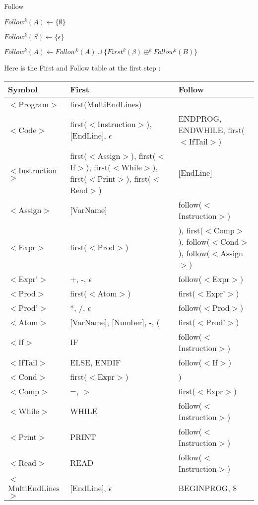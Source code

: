 \documentclass{article}
\begin{document}
\begin{algorithm}[H]
\caption{Follow}
\begin{algorithmic}
    \STATE $Follow^k (A) \gets \{\emptyset\}$
\ENDFOR

\STATE $Follow^k(S) \gets \{\epsilon\}$

\REPEAT
        \STATE $Follow^k(A) \gets Follow^k(A) \cup \{First^k(\beta) \oplus^k Follow^k(B)\}$
    \ENDIF
{}
\end{algorithmic}
\end{algorithm}

\noindent Here is the First and Follow table at the first step :

\begin{center}
\begin{tabular}{|m{3cm}|m{8cm}|m{6cm}|}
\hline
Symbol & First & Follow \\
\hline\hline
$<$Program$>$ & first(MultiEndLines) &\\
\hline
$<$Code$>$ & first($<$Instruction$>$), [EndLine], $\epsilon$ & ENDPROG, ENDWHILE, first($<$IfTail$>$) \\
\hline
$<$Instruction$>$ & first($<$Assign$>$), first($<$If$>$), first($<$While$>$), first($<$Print$>$), first($<$Read$>$) & [EndLine] \\
\hline
$<$Assign$>$ & [VarName] & follow($<$Instruction$>$) \\
\hline
$<$Expr$>$ & first($<$Prod$>$) & ), first($<$Comp$>$), follow($<$Cond$>$), follow($<$Assign$>$) \\
\hline
$<$Expr'$>$ & +, -, $\epsilon$ & follow($<$Expr$>$) \\
\hline
$<$Prod$>$ & first($<$Atom$>$) & first($<$Expr'$>$) \\
\hline
$<$Prod'$>$ & *, /, $\epsilon$ & follow($<$Prod$>$) \\
\hline
$<$Atom$>$ & [VarName], [Number], -, ( & first($<$Prod'$>$) \\
\hline
$<$If$>$ & IF & follow($<$Instruction$>$) \\
\hline
$<$IfTail$>$ & ELSE, ENDIF & follow($<$If$>$) \\
\hline
$<$Cond$>$ & first($<$Expr$>$) & ) \\
\hline
$<$Comp$>$ & =, $>$ & first($<$Expr$>$) \\
\hline
$<$While$>$ & WHILE & follow($<$Instruction$>$) \\
\hline
$<$Print$>$ & PRINT & follow($<$Instruction$>$) \\
\hline
$<$Read$>$ & READ & follow($<$Instruction$>$) \\
\hline
$<$MultiEndLines$>$ & [EndLine], $\epsilon$ & BEGINPROG, \$ \\

\hline
\end{tabular}
\end{center}
\end{document}
